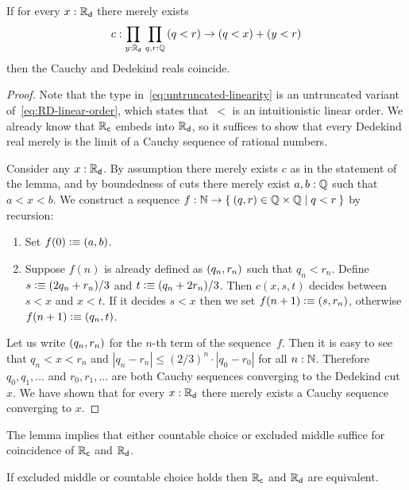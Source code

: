 \begin{lem} \label{lem:untruncated-linearity-reals-coincide}
  If for every $x : \mathbb{R}_\mathsf{d}$ there merely exists
  \begin{equation}
    \label{eq:untruncated-linearity}
    c : \prd{y : \RD} \prd{q, r : \Q} (q < r) \to (q < x) + (y < r)
  \end{equation}
  then the Cauchy and Dedekind reals coincide.
\end{lem}

\begin{proof}
  Note that the type in~\eqref{eq:untruncated-linearity} is an untruncated variant
  of~\eqref{eq:RD-linear-order}, which states that~$<$ is an intuitionistic linear order.
  We already know that $\mathbb{R}_\mathsf{c}$ embeds into $\mathbb{R}_\mathsf{d}$, so it suffices to show that every Dedekind
  real merely is the limit of a Cauchy sequence of rational numbers.

  Consider any $x : \mathbb{R}_\mathsf{d}$. By assumption there merely exists $c$ as in the statement of the
  lemma, and by boundedness of cuts there merely exist $a, b : \mathbb{Q}$ such that $a < x < b$.
  We construct a sequence $f : \N \to \setof{ \pairr{q, r} \in \Q \times \Q | q < r }$ by
  recursion:
  \begin{enumerate}
  \item Set $f(0) \vcentcolon\equiv {\mathopen{}(a, b)\mathclose{}}$.
  \item Suppose $f(n)$ is already defined as ${\mathopen{}(q_n, r_n)\mathclose{}}$ such that $q_n < r_n$.
    Define $s \vcentcolon\equiv (2 q_n + r_n)/3$ and $t \vcentcolon\equiv (q_n + 2 r_n)/3$. Then $c(x,s,t)$
    decides between $s < x$ and $x < t$. If it decides $s < x$ then we set $f(n+1) \vcentcolon\equiv
    {\mathopen{}(s, r_n)\mathclose{}}$, otherwise $f(n+1) \vcentcolon\equiv {\mathopen{}(q_n, t)\mathclose{}}$.
  \end{enumerate}
  Let us write ${\mathopen{}(q_n, r_n)\mathclose{}}$ for the $n$-th term of the sequence~$f$. Then it is easy
  to see that $q_n < x < r_n$ and $|q_n - r_n| \leq (2/3)^n \cdot |q_0 - r_0|$ for all $n
  : \mathbb{N}$. Therefore $q_0, q_1, \ldots$ and $r_0, r_1, \ldots$ are both Cauchy sequences
  converging to the Dedekind cut~$x$. We have shown that for every $x : \mathbb{R}_\mathsf{d}$ there merely
  exists a Cauchy sequence converging to $x$.
\end{proof}

The lemma implies that either countable choice or excluded middle suffice for coincidence
of $\mathbb{R}_\mathsf{c}$ and $\mathbb{R}_\mathsf{d}$.

\begin{cor} \label{when-reals-coincide}
  If excluded middle or countable choice holds then $\mathbb{R}_\mathsf{c}$ and $\mathbb{R}_\mathsf{d}$ are equivalent.
\end{cor}

